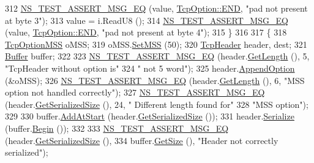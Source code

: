 \begin{DoxyCode}
312     \hyperlink{group__testing_ga2a9d78cffb3db8e867c35fff0b698cf5}{NS\_TEST\_ASSERT\_MSG\_EQ} (value, \hyperlink{rocketfuel-topology-reader_8cc_a29fd18bed01c4d836c7ebfe73a125c3f}{TcpOption::END}, \textcolor{stringliteral}{"pad not present at
       byte 3"});
313     value = i.ReadU8 ();
314     \hyperlink{group__testing_ga2a9d78cffb3db8e867c35fff0b698cf5}{NS\_TEST\_ASSERT\_MSG\_EQ} (value, \hyperlink{rocketfuel-topology-reader_8cc_a29fd18bed01c4d836c7ebfe73a125c3f}{TcpOption::END}, \textcolor{stringliteral}{"pad not present at
       byte 4"});
315   \}
316 
317   \{
318     \hyperlink{classns3_1_1TcpOptionMSS}{TcpOptionMSS} oMSS;
319     oMSS.\hyperlink{classns3_1_1TcpOptionMSS_a37e70e6d3652f2e718b35d3c19cc1896}{SetMSS} (50);
320     \hyperlink{classns3_1_1TcpHeader}{TcpHeader} header, dest;
321     \hyperlink{classns3_1_1Buffer}{Buffer} buffer;
322 
323     \hyperlink{group__testing_ga2a9d78cffb3db8e867c35fff0b698cf5}{NS\_TEST\_ASSERT\_MSG\_EQ} (header.\hyperlink{classns3_1_1TcpHeader_a957928d2dd1108dc1ef8c38daecdcf62}{GetLength} (), 5, \textcolor{stringliteral}{"TcpHeader without option
       is"}
324                            \textcolor{stringliteral}{" not 5 word"});
325     header.\hyperlink{classns3_1_1TcpHeader_aa5de13df3dd5cb87d63c428e5dcc3425}{AppendOption} (&oMSS);
326     \hyperlink{group__testing_ga2a9d78cffb3db8e867c35fff0b698cf5}{NS\_TEST\_ASSERT\_MSG\_EQ} (header.\hyperlink{classns3_1_1TcpHeader_a957928d2dd1108dc1ef8c38daecdcf62}{GetLength} (), 6, \textcolor{stringliteral}{"MSS option not handled
       correctly"});
327     \hyperlink{group__testing_ga2a9d78cffb3db8e867c35fff0b698cf5}{NS\_TEST\_ASSERT\_MSG\_EQ} (header.\hyperlink{classns3_1_1TcpHeader_a1cbb8a10b7838d428f2e94806d3ce807}{GetSerializedSize} (), 24, \textcolor{stringliteral}{"
      Different length found for"}
328                            \textcolor{stringliteral}{"MSS option"});
329 
330     buffer.\hyperlink{classns3_1_1Buffer_a8abd8164c3671d3dadc98fc66fade7b1}{AddAtStart} (header.\hyperlink{classns3_1_1TcpHeader_a1cbb8a10b7838d428f2e94806d3ce807}{GetSerializedSize} ());
331     header.\hyperlink{classns3_1_1TcpHeader_ab492a55e7e9a54ec4938035696877aa3}{Serialize} (buffer.\hyperlink{classns3_1_1Buffer_a893d4bf50df13e730b6cd0fda91b967f}{Begin} ());
332 
333     \hyperlink{group__testing_ga2a9d78cffb3db8e867c35fff0b698cf5}{NS\_TEST\_ASSERT\_MSG\_EQ} (header.\hyperlink{classns3_1_1TcpHeader_a1cbb8a10b7838d428f2e94806d3ce807}{GetSerializedSize} (),
334                            buffer.\hyperlink{classns3_1_1Buffer_a3047b8f2dad303c6370695122f1884f0}{GetSize} (), \textcolor{stringliteral}{"Header not correctly serialized"});

\end{DoxyCode}
